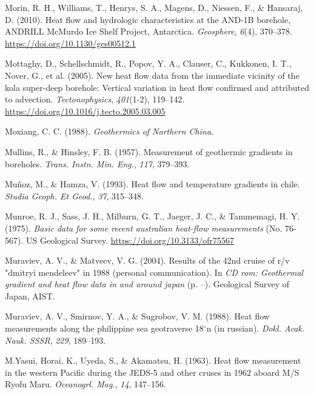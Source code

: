 \begin{CSLReferences}{1}{1}
\leavevmode{}%
Morin, R. H., Williams, T., Henrys, S. A., Magens, D., Niessen, F., \& Hansaraj, D. (2010). Heat flow and hydrologic characteristics at the {AND-1B} borehole, {ANDRILL McMurdo Ice Shelf Project, Antarctica}. \emph{Geosphere}, \emph{6}(4), 370--378. \url{https://doi.org/10.1130/ges00512.1}

\leavevmode{}%
Mottaghy, D., Schellschmidt, R., Popov, Y. A., Clauser, C., Kukkonen, I. T., Nover, G., et al. (2005). New heat flow data from the immediate vicinity of the kola super-deep borehole: Vertical variation in heat flow confirmed and attributed to advection. \emph{Tectonophysics}, \emph{401}(1-2), 119--142. \url{https://doi.org/10.1016/j.tecto.2005.03.005}

\leavevmode{}%
Moxiang, C. C. (1988). \emph{Geothermics of Northern China}.

\leavevmode{}%
Mullins, R., \& Hinsley, F. B. (1957). Measurement of geothermic gradients in boreholes. \emph{Trans. Instn. Min. Eng.}, \emph{117}, 379--393.

\leavevmode{}%
Muñoz, M., \& Hamza, V. (1993). Heat flow and temperature gradients in chile. \emph{Studia Geoph. Et Geod.}, \emph{37}, 315--348.

\leavevmode{}%
Munroe, R. J., Sass, J. H., Milburn, G. T., Jaeger, J. C., \& Tammemagi, H. Y. (1975). \emph{Basic data for some recent australian heat-flow measurements} (No. 76-567). {US} Geological Survey. \url{https://doi.org/10.3133/ofr75567}

\leavevmode{}%
Muraviev, A. V., \& Matveev, V. G. (2004). Results of the 42nd cruise of r/v "dmitryi mendeleev" in 1988 (personal communication). In \emph{CD rom: Geothermal gradient and heat flow data in and around japan} (p. --). Geological Survey of Japan, AIST.

\leavevmode{}%
Muraviev, A. V., Smirnov, Y. A., \& Sugrobov, V. M. (1988). Heat flow measurements along the philippine sea geotraverse 18{\(^\circ\)}n (in russian). \emph{Dokl. Acak. Nauk. SSSR}, \emph{229}, 189--193.

\leavevmode{}%
M.Yasui, Horai, K., Uyeda, S., \& Akamatsu, H. (1963). Heat flow measurement in the western {Pacific} during the {JEDS-5} and other cruses in 1962 aboard {M/S Ryofu Maru}. \emph{Oceanogrl. Mag.}, \emph{14}, 147--156.


\end{CSLReferences}
